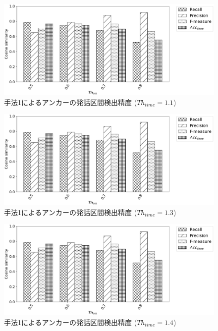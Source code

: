 \begin{figure}[H]
  \begin{center}
    \includegraphics[scale=0.5]{./figure/prob1_11.eps}
  \end{center}
  \caption{手法1によるアンカーの発話区間検出精度 ($Th_{time}=1.1$)}
\end{figure}

\begin{figure}[H]
  \begin{center}
    \includegraphics[scale=0.5]{./figure/prob1_13.eps}
  \end{center}
  \caption{手法1によるアンカーの発話区間検出精度 ($Th_{time}=1.3$)}
\end{figure}

\begin{figure}[H]
  \begin{center}
    \includegraphics[scale=0.5]{./figure/prob1_14.eps}
  \end{center}
  \caption{手法1によるアンカーの発話区間検出精度 ($Th_{time}=1.4$)}
\end{figure}

